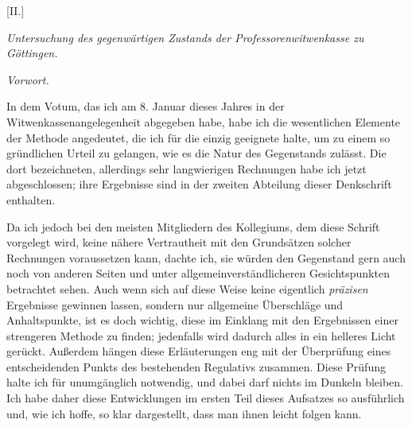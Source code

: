 \begin{center}
{\large [II.]\par}\medskip
\textit{Untersuchung des gegenwärtigen Zustands der Professorenwitwenkasse zu Göttingen.}\par\medskip
\textit{Vorwort.}\par
\end{center}
\noindent\hspace*{\parindent}In dem Votum, das ich am 8. Januar dieses Jahres in der Witwenkassenangelegenheit abgegeben habe, habe ich die wesentlichen Elemente der Methode angedeutet, die ich für die einzig geeignete halte, um zu einem so gründlichen Urteil zu gelangen, wie es die Natur des Gegenstands zulässt. Die dort bezeichneten, allerdings sehr langwierigen Rechnungen habe ich jetzt abgeschlossen; ihre Ergebnisse sind in der zweiten Abteilung dieser Denkschrift enthalten.

Da ich jedoch bei den meisten Mitgliedern des Kollegiums, dem diese Schrift vorgelegt wird, keine nähere Vertrautheit mit den Grundsätzen solcher Rechnungen voraussetzen kann, dachte ich, sie würden den Gegenstand gern auch noch von anderen Seiten und unter allgemeinverständlicheren Gesichtspunkten betrachtet sehen. Auch wenn sich auf diese Weise keine eigentlich \textit{präzisen}
Ergebnisse gewinnen lassen, sondern nur allgemeine Überschläge und Anhaltspunkte, ist es doch wichtig, diese im Einklang mit den Ergebnissen einer strengeren Methode zu finden; jedenfalls wird dadurch alles in ein helleres Licht gerückt. Außerdem hängen diese Erläuterungen eng mit der Überprüfung eines entscheidenden Punkts des bestehenden Regulativs zusammen. Diese Prüfung halte ich für unumgänglich notwendig, und dabei darf nichts im Dunkeln bleiben. Ich habe daher diese Entwicklungen im ersten Teil dieses Aufsatzes so ausführlich und, wie ich hoffe, so klar dargestellt, dass man ihnen leicht folgen kann.

